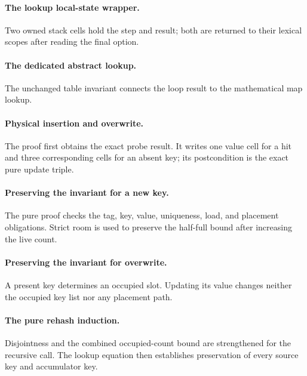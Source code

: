 \documentclass[11pt]{article}
\begin{document}
\paragraph{The lookup local-state wrapper.} Two owned stack cells hold the step and result; both are returned to their lexical scopes after reading the final option.



\paragraph{The dedicated abstract lookup.} The unchanged table invariant connects the loop result to the mathematical map lookup.



\paragraph{Physical insertion and overwrite.} The proof first obtains the exact probe result. It writes one value cell for a hit and three corresponding cells for an absent key; its postcondition is the exact pure update triple.



\paragraph{Preserving the invariant for a new key.} The pure proof checks the tag, key, value, uniqueness, load, and placement obligations. Strict room is used to preserve the half-full bound after increasing the live count.



\paragraph{Preserving the invariant for overwrite.} A present key determines an occupied slot. Updating its value changes neither the occupied key list nor any placement path.



\paragraph{The pure rehash induction.} Disjointness and the combined occupied-count bound are strengthened for the recursive call. The lookup equation then establishes preservation of every source key and accumulator key.
\end{document}

